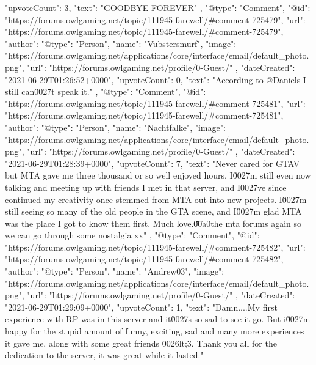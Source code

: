 {{            "upvoteCount": 3,
            "text": "GOODBYE FOREVER\n \n"
        },
        {
            "@type": "Comment",
            "@id": "https://forums.owlgaming.net/topic/111945-farewell/#comment-725479",
            "url": "https://forums.owlgaming.net/topic/111945-farewell/#comment-725479",
            "author": {
                "@type": "Person",
                "name": "Vubstersmurf",
                "image": "https://forums.owlgaming.net/applications/core/interface/email/default_photo.png",
                "url": "https://forums.owlgaming.net/profile/0-Guest/"
            },
            "dateCreated": "2021-06-29T01:26:52+0000",
            "upvoteCount": 0,
            "text": "According to @Daniels I still can\u0027t speak it.\n \n"
        },
        {
            "@type": "Comment",
            "@id": "https://forums.owlgaming.net/topic/111945-farewell/#comment-725481",
            "url": "https://forums.owlgaming.net/topic/111945-farewell/#comment-725481",
            "author": {
                "@type": "Person",
                "name": "Nachtfalke",
                "image": "https://forums.owlgaming.net/applications/core/interface/email/default_photo.png",
                "url": "https://forums.owlgaming.net/profile/0-Guest/"
            },
            "dateCreated": "2021-06-29T01:28:39+0000",
            "upvoteCount": 7,
            "text": "Never cared for GTAV but MTA gave me three thousand or so well enjoyed hours. I\u0027m still even now talking and meeting up with friends I met in that server, and I\u0027ve since continued my creativity once stemmed from MTA out into new projects. I\u0027m still seeing so many of the old people in the GTA scene, and I\u0027m glad MTA was the place I got to know them first. Much love.\n \n\n\n\t\u00a0\n \n\n\n\tunlock the mta forums again so we can go through some nostalgia xx\n \n"
        },
        {
            "@type": "Comment",
            "@id": "https://forums.owlgaming.net/topic/111945-farewell/#comment-725482",
            "url": "https://forums.owlgaming.net/topic/111945-farewell/#comment-725482",
            "author": {
                "@type": "Person",
                "name": "Andrew03",
                "image": "https://forums.owlgaming.net/applications/core/interface/email/default_photo.png",
                "url": "https://forums.owlgaming.net/profile/0-Guest/"
            },
            "dateCreated": "2021-06-29T01:29:09+0000",
            "upvoteCount": 1,
            "text": "Damn....My first experience with RP was in this server and it\u0027s so sad to see it go. But i\u0027m happy for the stupid amount of funny, exciting, sad and many more experiences it gave me, along with some great friends \u0026lt;3. Thank you all for the dedication to the server, it was great while it lasted.\n \n"
}}
